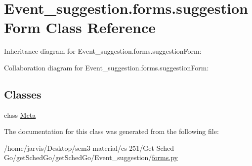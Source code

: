 \hypertarget{classEvent__suggestion_1_1forms_1_1suggestionForm}{}\section{Event\+\_\+suggestion.\+forms.\+suggestion\+Form Class Reference}
\label{classEvent__suggestion_1_1forms_1_1suggestionForm}


Inheritance diagram for Event\+\_\+suggestion.\+forms.\+suggestion\+Form\+:


Collaboration diagram for Event\+\_\+suggestion.\+forms.\+suggestion\+Form\+:
\subsection*{Classes}
\begin{DoxyCompactItemize}
\item 
class \hyperlink{classEvent__suggestion_1_1forms_1_1suggestionForm_1_1Meta}{Meta}
\end{DoxyCompactItemize}


The documentation for this class was generated from the following file\+:\begin{DoxyCompactItemize}
\item 
/home/jarvis/\+Desktop/sem3 material/cs 251/\+Get-\/\+Sched-\/\+Go/get\+Sched\+Go/get\+Sched\+Go/\+Event\+\_\+suggestion/\hyperlink{Event__suggestion_2forms_8py}{forms.\+py}\end{DoxyCompactItemize}
